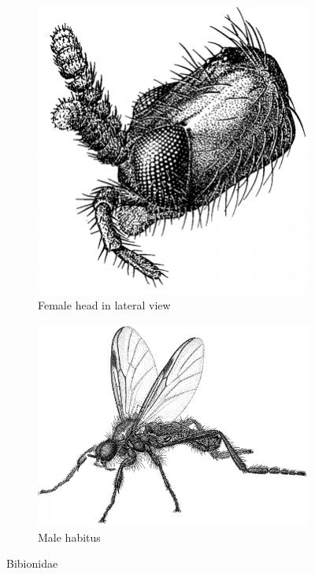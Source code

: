 \documentclass[letterpaper, 11pt]{article}
\begin{document}
\begin{figure}[ht!]
    \centering
    \begin{subfigure}[ht!]{0.25\textwidth}
        \includegraphics[width=\textwidth]{BibionidHead}
        \caption{Female head in lateral view \citep[][Fig. 13.3]{mcalpine1981manual}}
        \label{fig:bibionid1}
    \end{subfigure}
    \qquad
    \begin{subfigure}[ht!]{0.47\textwidth}
        \includegraphics[width=\textwidth]{BibionidHabitus}
        \caption{Male habitus \citep[][Fig. 13.1]{mcalpine1981manual}}
        \label{fig:bibionid2}
    \end{subfigure}
    \caption{Bibionidae}\label{fig:bibionids}
\end{figure}
\end{document}
